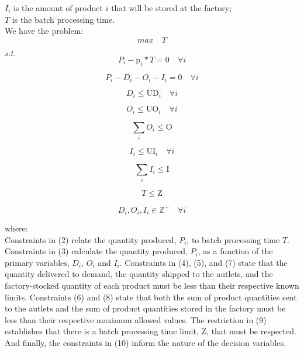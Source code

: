 \documentclass[preprint,12pt,authoryear]{elsarticle}
\begin{document}
$I_i$ is the amount of product $i$ that will be stored at the factory; \\

$T$ is the batch processing time. \\

We have the problem: \\

\begin{equation}
max \quad T
\end{equation}

$s.t.$ \\

\begin{equation}
P_i - \textrm{p}_i * T  = 0 \quad \forall i
\end{equation}

\begin{equation}
P_i - D_i - O_i - I_i = 0 \quad \forall i
\end{equation}

\begin{equation}
D_i \leq \textrm{UD}_i \quad \forall i
\end{equation}

\begin{equation}
O_i \leq \textrm{UO}_i \quad \forall i
\end{equation}

\begin{equation}
\sum_i{O_i} \leq \textrm{O}
\end{equation}

\begin{equation}
I_i \leq \textrm{UI}_i \quad \forall i
\end{equation}

\begin{equation}
\sum_i{I_i} \leq \textrm{I}
\end{equation}

\begin{equation}
T \leq \textrm{Z}
\end{equation}

\begin{equation}
D_i, O_i, I_i \in  \mathbb{Z}^+ \quad \forall i
\end{equation}

where: \\

Constraints in (2) relate the quantity produced, $P_i$, to batch processing time $T$. Constraints in (3) calculate the quantity produced, $P_i$, as a function of the primary variables, $D_i$, $O_i$ and $I_i$. Constraints in (4), (5), and (7) state that the quantity delivered to demand, the quantity shipped to the autlets, and the factory-stocked quantity of each product must be less than their respective known limits. Constraints (6) and (8) state that both the sum of product quantities sent to the autlets and the sum of product quantities stored in the factory must be less than their respective maximum allowed values. The restriction in (9) establishes that there is a batch processing time limit, $\textrm{Z}$, that must be respected. And finally, the constraints in (10) inform the nature of the decision variables.
\end{document}
